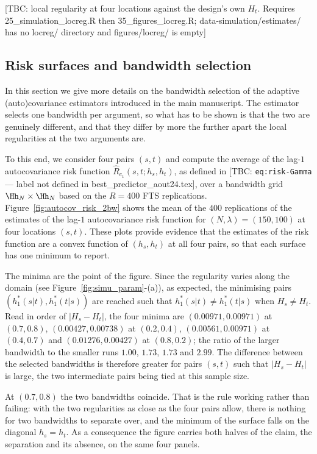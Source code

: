 \color{magenta}
[TBC: local regularity at four locations against the design's own $H_t$. Requires 25\_simulation\_locreg.R then 35\_figures\_locreg.R; data-simulation/estimates/ has no locreg/ directory and figures/locreg/ is empty]
\color{black}

\subsection{\color{magenta}Risk surfaces and bandwidth selection\color{black}}

\color{magenta}
In this section we give more details on the bandwidth selection of the adaptive (auto)covariance estimators introduced in the main manuscript. The estimator selects one bandwidth per argument, so what has to be shown is that the two are genuinely different, and that they differ by more the further apart the local regularities at the two arguments are.

To this end, we consider four pairs $(s, t)$ and compute the average of the lag-$1$ autocovariance risk function $\widehat{R}_{c_1}(s, t; h_s, h_t)$, as defined in [TBC: \texttt{eq:risk-Gamma} --- label not defined in best\_predictor\_aout24.tex], over a bandwidth grid $\Hh_N \times \Hh_N$ based on the $R = 400$ FTS replications. Figure~\ref{fig:autocov_risk_2bw} shows the mean of the $400$ replications of the estimates of the lag-$1$ autocovariance risk function for $(N, \lambda) = (150, 100)$ at four locations $(s,t)$. These plots provide evidence that the estimates of the risk function are a convex function of $(h_s, h_t)$ at all four pairs, so that each surface has one minimum to report.

The minima are the point of the figure. Since the regularity varies along the domain (see Figure~\ref{fig:simu_param}-(a)), as expected, the minimising pairs $(h_1^*(s|t), h_1^*(t|s))$ are reached such that $h_1^*(s|t) \neq h_1^*(t|s)$ when $H_s \neq H_t$. Read in order of $|H_s - H_t|$, the four minima are $(0.00971, 0.00971)$ at $(0.7, 0.8)$, $(0.00427, 0.00738)$ at $(0.2, 0.4)$, $(0.00561, 0.00971)$ at $(0.4, 0.7)$ and $(0.01276, 0.00427)$ at $(0.8, 0.2)$; the ratio of the larger bandwidth to the smaller runs $1.00$, $1.73$, $1.73$ and $2.99$. The difference between the selected bandwidths is therefore greater for pairs $(s,t)$ such that $|H_s - H_t|$ is large, the two intermediate pairs being tied at this sample size.

At $(0.7, 0.8)$ the two bandwidths coincide. That is the rule working rather than failing: with the two regularities as close as the four pairs allow, there is nothing for two bandwidths to separate over, and the minimum of the surface falls on the diagonal $h_s = h_t$. As a consequence the figure carries both halves of the claim, the separation and its absence, on the same four panels.
\color{black}

